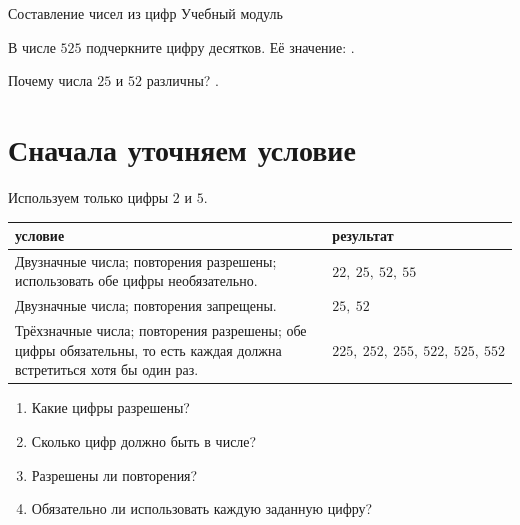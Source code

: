 \worksheettitle
  {Составление чисел из цифр}
  { Учебный модуль}

\studentnameblock



\begin{checkpointbox}[Вход]
  В числе \(525\) подчеркните цифру десятков. Её значение:
  \answerblank[20mm].

  Почему числа \(25\) и \(52\) различны?
  \answerblank[82mm].
\end{checkpointbox}



\section{Сначала уточняем условие}

\begin{problembox}
  Используем только цифры \(2\) и \(5\).
  \begin{center}
  \renewcommand{\arraystretch}{1.35}
  \begin{tabular}{>{\raggedright\arraybackslash}p{54mm}|p{83mm}}
    \toprule
    условие & результат \\
    \midrule
    Двузначные числа; повторения разрешены; использовать обе цифры
    необязательно. & \(22,\ 25,\ 52,\ 55\) \\
    Двузначные числа; повторения запрещены. & \(25,\ 52\) \\
    Трёхзначные числа; повторения разрешены; обе цифры обязательны, то есть
    каждая должна встретиться хотя бы один раз. &
    \(225,\ 252,\ 255,\ 522,\ 525,\ 552\) \\
    \bottomrule
  \end{tabular}
  \end{center}
\end{problembox}

\begin{notebox}
  \begin{enumerate}[label=\textbf{\arabic*.}]
    \item Какие цифры разрешены?
    \item Сколько цифр должно быть в числе?
    \item Разрешены ли повторения?
    \item Обязательно ли использовать каждую заданную цифру?
  \end{enumerate}
\end{notebox}

